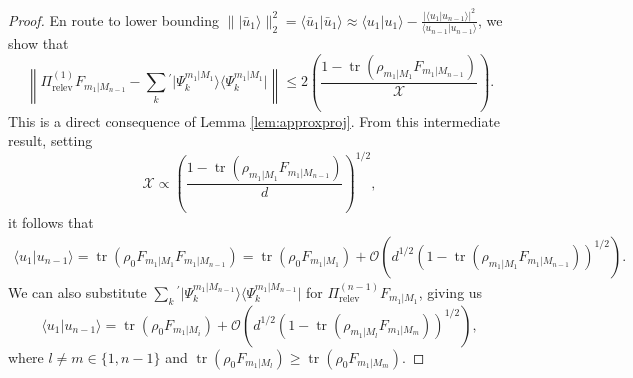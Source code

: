 \begin{proof}
En route to lower bounding $\| \vert \bar{u}_1 \rangle \|_2^{2} = \langle \bar{u}_1\vert \bar{u}_1 \rangle \approx \langle u_1 \vert u_1 \rangle - \frac{\vert \langle u_1 \vert u_{n-1}\rangle \vert ^2}{\langle u_{n-1} \vert u_{n-1}\rangle}$, we show that 
\begin{equation}
\left\|\Pi_{\text{relev}}^{(1)}F_{m_1\vert M_{n-1}}-\sum_k{}^{'}\vert \Psi_k^{m_1\vert M_1} \rangle \langle \Psi_k^{m_1\vert M_1} \vert \right\| \leq 2\left( \frac{1-  \operatorname{tr}(\rho_{m_1\vert M_1}F_{m_1\vert M_{n-1}}) }{\mathcal{X}} \right).
\end{equation} This is a direct consequence of Lemma \ref{lem:approxproj}.
From this intermediate result, setting \begin{equation}
\mathcal{X}\propto\left(\frac{1-\operatorname{tr}(\rho_{m_1\vert M_1}F_{m_1\vert M_{n-1}})}{d}\right)^{1/2},\end{equation}
 it follows that 
\begin{equation}
\begin{split}
\langle u_1 \vert u_{n-1}\rangle =  \operatorname{tr}(\rho_0 F_{m_1 \vert M_1} F_{m_1 \vert M_{n-1}}) = \operatorname{tr}(\rho_0F_{m_1\vert M_1}) +\mathcal{O}\left(d^{1/2} \left(1-\operatorname{tr}(\rho_{m_1\vert M_1}F_{m_1\vert M_{n-1}})\right)^{1/2} \right).
\end{split}
\end{equation}
We can also substitute $\sum_k{}^{'}\vert \Psi_k ^{m_1\vert M_{n-1}}\rangle \langle \Psi_k ^{m_1\vert M_{n-1}} \vert$ for $\Pi_{\text{relev}}^{(n-1)}F_{m_1\vert M_1}$, giving us\vspace{0.5em}
\begin{equation}
\langle u_1 \vert u_{n-1}\rangle = \operatorname{tr}(\rho_0 F_{m_1\vert M_i}) +  \mathcal{O}\left(d^{1/2} \left(1-\operatorname{tr}(\rho_{m_1\vert M_l}F_{m_1\vert M_m})\right)^{1/2} \right),\end{equation}
\vspace{0.5em}
where $l\neq m \in \{1,n-1\}$ and $\operatorname{tr}(\rho_0 F_{m_1\vert M_l})\geq \operatorname{tr}(\rho_0 F_{m_1\vert M_m})$.


\end{proof}
